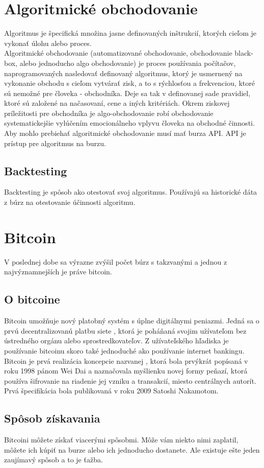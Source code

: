 \section{Algoritmické obchodovanie}
Algoritmus je špecifická množina jasne definovaných inštrukcií, ktorých cieľom je vykonať úlohu alebo proces. \\
Algoritmické obchodovanie (automatizované obchodovanie, obchodovanie black-box, alebo jednoducho algo obchodovanie) je proces používania počítačov, naprogramovaných nasledovať definovaný algoritmus, ktorý je usmernený na vykonanie obchodu s cieľom vytvárať zisk, a to s  rýchlosťou a frekvenciou, ktoré sú nemožné pre človeka - obchodníka. Deje sa tak v definovanej sade pravidiel, ktoré sú založené na načasovaní, cene a iných kritériách. Okrem ziskovej príležitosti pre obchodníka je algo-obchodovanie %
robí obchodovanie systematickejšie vylúčením emocionálneho vplyvu človeka na obchodné činnosti.\cite{Ba} \\
Aby mohlo prebiehať algoritmické obchodovanie musí mať burza API. API je prístup pre algoritmus na burzu.
\subsection{Backtesting} 
Backtesting je spôsob ako otestovať svoj algoritmus. Používajú sa historické dáta z búrz na otestovanie účinnosti algoritmu.
\section{Bitcoin} 
V poslednej dobe sa výrazne zvýšil počet búrz s takzvanými  a jednou z najvýznamnejších je práve bitcoin.
\subsection{O bitcoine} 
Bitcoin umožňuje nový platobný systém s úplne digitálnymi peniazmi. Jedná sa o prvú decentralizovanú platbu siete , ktorá je poháňaná svojim užívateľom bez ústredného orgánu alebo sprostredkovateľov. Z užívateľského hľadiska je používanie bitcoinu skoro také jednoduché ako používanie internet bankingu. Bitcoin je prvá realizácia koncepcie nazvanej , ktorá bola prvýkrát popísaná v roku 1998 pánom Wei Dai a naznačovala myšlienku novej formy peňazí, ktorá používa šifrovanie na riadenie jej vzniku a transakcií, miesto centrálnych autorít.  Prvá špecifikácia bola publikovaná v roku 2009  Satoshi Nakamotom. 
\subsection{Spôsob získavania} 
Bitcoini môžete získať viacerými spôsobmi. Môže vám niekto nimi zaplatil, môžete ich kúpiť na burze alebo ich jednoducho dostanete. Ale existuje ešte jeden zaujímavý spôsob a to je ťažba. 
